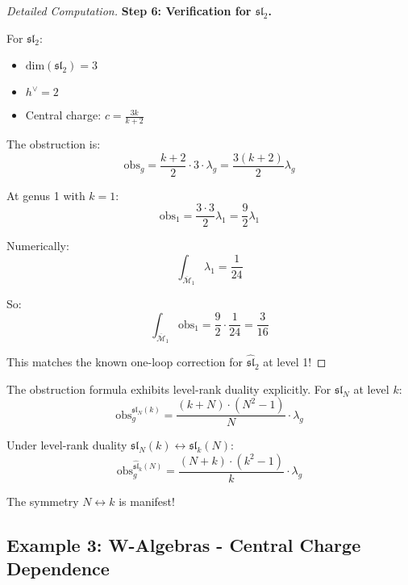 \begin{proof}[Detailed Computation]
\textbf{Step 6: Verification for $\mathfrak{sl}_2$.}

For $\mathfrak{sl}_2$:
\begin{itemize}
\item $\text{dim}(\mathfrak{sl}_2) = 3$
\item $h^\vee = 2$
\item Central charge: $c = \frac{3k}{k+2}$
\end{itemize}

The obstruction is:
$$\text{obs}_g = \frac{k+2}{2} \cdot 3 \cdot \lambda_g = \frac{3(k+2)}{2} \lambda_g$$

At genus 1 with $k=1$:
$$\text{obs}_1 = \frac{3 \cdot 3}{2} \lambda_1 = \frac{9}{2} \lambda_1$$

Numerically:
$$\int_{\overline{\mathcal{M}}_1} \lambda_1 = \frac{1}{24}$$

So:
$$\int_{\overline{\mathcal{M}}_1} \text{obs}_1 = \frac{9}{2} \cdot \frac{1}{24} = \frac{3}{16}$$

This matches the known one-loop correction for $\widehat{\mathfrak{sl}}_2$ at level 1!
\end{proof}

\begin{remark}\label{rem:level-rank-obstruction}
The obstruction formula exhibits level-rank duality explicitly. For $\mathfrak{sl}_N$ 
at level $k$:
$$\text{obs}_g^{\widehat{\mathfrak{sl}}_N(k)} = 
\frac{(k+N) \cdot (N^2-1)}{N} \cdot \lambda_g$$

Under level-rank duality $\mathfrak{sl}_N(k) \leftrightarrow \mathfrak{sl}_k(N)$:
$$\text{obs}_g^{\widehat{\mathfrak{sl}}_k(N)} = 
\frac{(N+k) \cdot (k^2-1)}{k} \cdot \lambda_g$$

The symmetry $N \leftrightarrow k$ is manifest!
\end{remark}

\subsection{Example 3: W-Algebras - Central Charge Dependence}
\label{subsec:w-algebra-obstruction}

